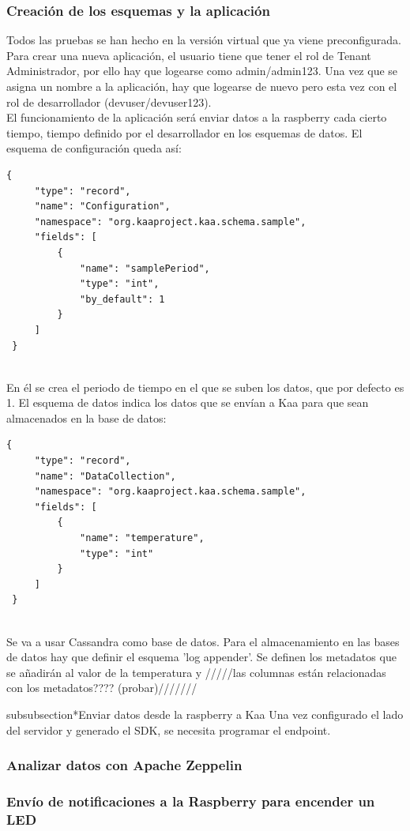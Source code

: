 \documentclass[12pt, twoside]{book}
\begin{document}
\subsubsection*{Creación de los esquemas y la aplicación}
Todos las pruebas se han hecho en la versión virtual que ya viene preconfigurada.\\ 
Para crear una nueva aplicación, el usuario tiene que tener el rol de Tenant Administrador, por ello hay que logearse como admin/admin123. Una vez que se asigna un nombre a la aplicación, hay que logearse de nuevo pero esta vez con el rol de desarrollador (devuser/devuser123). \\
El funcionamiento de la aplicación será enviar datos a la raspberry cada cierto tiempo, tiempo definido por el desarrollador en los esquemas de datos. 
El esquema de configuración queda así:
\begin{lstlisting}
{
     "type": "record",
     "name": "Configuration",
     "namespace": "org.kaaproject.kaa.schema.sample",
     "fields": [
         {
             "name": "samplePeriod",
             "type": "int",
             "by_default": 1
         }
     ]
 }
 
\end{lstlisting}
En él se crea el periodo de tiempo en el que se suben los datos, que por defecto es 1.
El esquema de datos indica los datos que se envían a Kaa para que sean almacenados en la base de datos:
\begin{lstlisting}
{
     "type": "record",
     "name": "DataCollection",
     "namespace": "org.kaaproject.kaa.schema.sample",
     "fields": [
         {
             "name": "temperature",
             "type": "int"
         }
     ]
 }
 
\end{lstlisting}
Se va a usar Cassandra como base de datos. Para el almacenamiento en las bases de datos hay que definir el esquema 'log appender'. Se definen los metadatos que se añadirán al valor de la temperatura y /////las columnas están relacionadas con los metadatos???? (probar)/////// 

subsubsection*{Enviar datos desde la raspberry a Kaa}
Una vez configurado el lado del servidor y generado el SDK, se necesita programar el endpoint.
\subsubsection*{Analizar datos con Apache Zeppelin}

\subsubsection*{Envío de notificaciones a la Raspberry para encender un LED}
\end{document}
